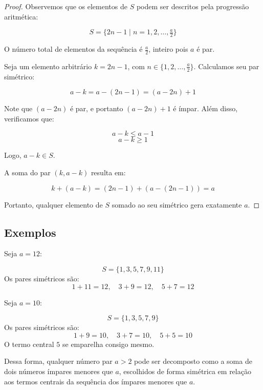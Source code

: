 \documentclass[a4paper,11pt]{article}
\theoremstyle{definition}
\theoremstyle{remark}
\begin{document}
\begin{otherlanguage}{brazil}
	
	\begin{proof}
		Observemos que os elementos de $S$ podem ser descritos pela progressão aritmética:
		
		\[
		S = \{2n - 1 \mid n = 1, 2, \dotsc, \tfrac{a}{2} \}
		\]
		
		O número total de elementos da sequência é $\tfrac{a}{2}$, inteiro pois $a$ é par.
		
		Seja um elemento arbitrário $k = 2n - 1$, com $n \in \{1, 2, \dotsc, \tfrac{a}{2}\}$. Calculamos seu par simétrico:
		
		\[
		a - k = a - (2n - 1) = (a - 2n) + 1
		\]
		
		Note que $(a - 2n)$ é par, e portanto $(a - 2n) + 1$ é ímpar. Além disso, verificamos que:
		
		\[
		a - k \leq a - 1
		\]
		\[
		a - k \geq 1
		\]
		
		Logo, $a - k \in S$.
		
		A soma do par $(k, a - k)$ resulta em:
		
		\[
		k + (a - k) = (2n - 1) + (a - (2n - 1)) = a
		\]
		
		Portanto, qualquer elemento de $S$ somado ao seu simétrico gera exatamente $a$.
		
	\end{proof}
	
	\subsection{Exemplos}
	
	Seja $a = 12$:
	
	\[
	S = \{1, 3, 5, 7, 9, 11\}
	\]
	Os pares simétricos são:
	\[
	1 + 11 = 12, \quad 3 + 9 = 12, \quad 5 + 7 = 12
	\]
	
	Seja $a = 10$:
	
	\[
	S = \{1, 3, 5, 7, 9\}
	\]
	Os pares simétricos são:
	\[
	1 + 9 = 10, \quad 3 + 7 = 10, \quad 5 + 5 = 10
	\]
	O termo central $5$ se emparelha consigo mesmo.
	
	
	Dessa forma, qualquer número par $a > 2$ pode ser decomposto como a soma de dois números ímpares menores que $a$, escolhidos de forma simétrica em relação aos termos centrais da sequência dos ímpares menores que $a$.
		
	\vspace{1cm}
	

\end{otherlanguage}
\end{document}
